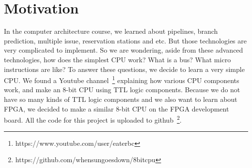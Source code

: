 \section{Motivation}
\label{sec:motivation}
In the computer architecture course, we learned about pipelines, branch prediction, multiple issue, reservation stations and etc. But those technologies are very complicated to implement. So we are wondering, aside from these advanced technologies, how does the simplest CPU work? What is a bus? What micro instructions are like? To answer these questions, we decide to learn a very simple CPU. We found a Youtube channel~\footnote{https://www.youtube.com/user/eaterbc} explaining how various CPU components work, and make an 8-bit CPU using TTL logic components. Because we do not have so many kinds of TTL logic components and we also want to learn about FPGA, we decided to make a similar 8-bit CPU on the FPGA development board. All the code for this project is uploaded to github~\footnote{https://github.com/whensungoesdown/8bitcpu}.
